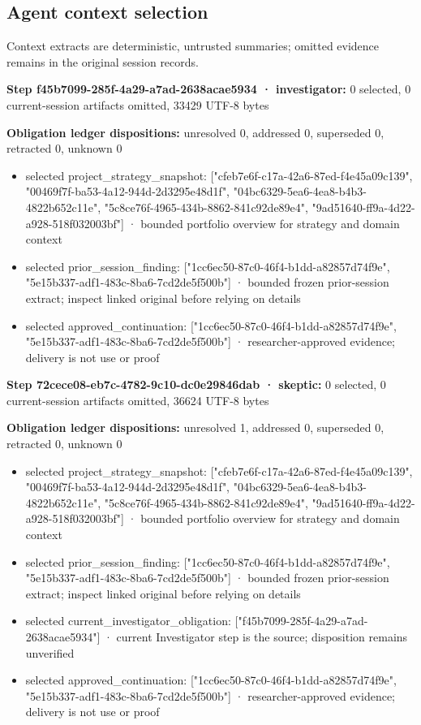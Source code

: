 \documentclass[11pt]{article}
\begin{document}
\subsection{Agent context selection}
Context extracts are deterministic, untrusted summaries; omitted evidence remains in the original session records.\par
\textbf{Step f45b7099-285f-4a29-a7ad-2638acae5934 · investigator:} 0 selected, 0 current-session artifacts omitted, 33429 UTF-8 bytes\par
\textbf{Obligation ledger dispositions:} unresolved 0, addressed 0, superseded 0, retracted 0, unknown 0\par
\begin{itemize}
\item selected project\_strategy\_snapshot: ["cfeb7e6f-c17a-42a6-87ed-f4e45a09c139", "00469f7f-ba53-4a12-944d-2d3295e48d1f", "04bc6329-5ea6-4ea8-b4b3-4822b652c11e", "5c8ce76f-4965-434b-8862-841c92de89e4", "9ad51640-ff9a-4d22-a928-518f032003bf"] · bounded portfolio overview for strategy and domain context
\item selected prior\_session\_finding: ["1cc6ec50-87c0-46f4-b1dd-a82857d74f9e", "5e15b337-adf1-483c-8ba6-7cd2de5f500b"] · bounded frozen prior-session extract; inspect linked original before relying on details
\item selected approved\_continuation: ["1cc6ec50-87c0-46f4-b1dd-a82857d74f9e", "5e15b337-adf1-483c-8ba6-7cd2de5f500b"] · researcher-approved evidence; delivery is not use or proof
\end{itemize}
\textbf{Step 72cece08-eb7c-4782-9c10-dc0e29846dab · skeptic:} 0 selected, 0 current-session artifacts omitted, 36624 UTF-8 bytes\par
\textbf{Obligation ledger dispositions:} unresolved 1, addressed 0, superseded 0, retracted 0, unknown 0\par
\begin{itemize}
\item selected project\_strategy\_snapshot: ["cfeb7e6f-c17a-42a6-87ed-f4e45a09c139", "00469f7f-ba53-4a12-944d-2d3295e48d1f", "04bc6329-5ea6-4ea8-b4b3-4822b652c11e", "5c8ce76f-4965-434b-8862-841c92de89e4", "9ad51640-ff9a-4d22-a928-518f032003bf"] · bounded portfolio overview for strategy and domain context
\item selected prior\_session\_finding: ["1cc6ec50-87c0-46f4-b1dd-a82857d74f9e", "5e15b337-adf1-483c-8ba6-7cd2de5f500b"] · bounded frozen prior-session extract; inspect linked original before relying on details
\item selected current\_investigator\_obligation: ["f45b7099-285f-4a29-a7ad-2638acae5934"] · current Investigator step is the source; disposition remains unverified
\item selected approved\_continuation: ["1cc6ec50-87c0-46f4-b1dd-a82857d74f9e", "5e15b337-adf1-483c-8ba6-7cd2de5f500b"] · researcher-approved evidence; delivery is not use or proof
\end{itemize}
\end{document}
